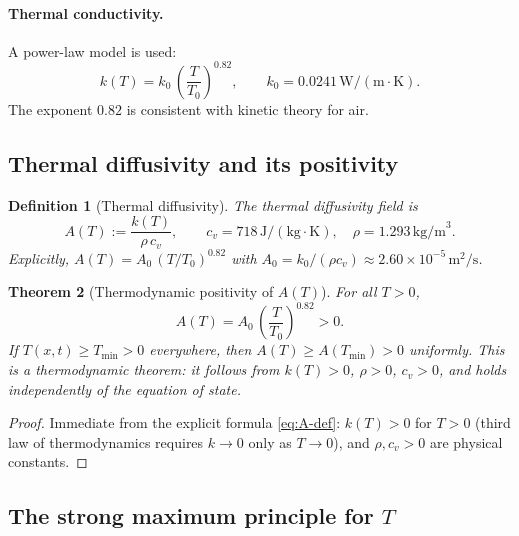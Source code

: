 \documentclass[12pt]{article}
\newtheorem{theorem}{Theorem}[section]
\newtheorem{definition}[theorem]{Definition}
\begin{document}
\paragraph{Thermal conductivity.}
A power-law model is used:
\begin{equation}
  \label{eq:k-power}
  k(T) = k_0\,\left(\frac{T}{T_0}\right)^{0.82},
  \qquad k_0 = 0.0241\,\mathrm{W/(m\cdot K)}.
\end{equation}
The exponent $0.82$ is consistent with kinetic theory for air.

\subsection{Thermal diffusivity and its positivity}
\label{ssec:A-field}

\begin{definition}[Thermal diffusivity]
  \label{def:AT}
  The \emph{thermal diffusivity field} is
  \begin{equation}
    \label{eq:A-def}
    A(T) := \frac{k(T)}{\rho\,c_v},
    \qquad c_v = 718\,\mathrm{J/(kg\cdot K)},\quad
    \rho = 1.293\,\mathrm{kg/m}^3.
  \end{equation}
  Explicitly, $A(T) = A_0\,(T/T_0)^{0.82}$ with
  $A_0 = k_0/(\rho c_v) \approx 2.60\times10^{-5}\,\mathrm{m}^2/\mathrm{s}$.
\end{definition}

\begin{theorem}[Thermodynamic positivity of $A(T)$]
  \label{thm:A-positive}
  For all $T > 0$,
  \begin{equation}
    \label{eq:A-positive}
    A(T) = A_0\,\left(\frac{T}{T_0}\right)^{0.82} > 0.
  \end{equation}
  If $T(x,t) \geq T_{\min} > 0$ everywhere, then $A(T) \geq A(T_{\min}) > 0$
  uniformly.  This is a thermodynamic theorem: it follows from $k(T) > 0$,
  $\rho > 0$, $c_v > 0$, and holds independently of the equation of state.
\end{theorem}

\begin{proof}
  Immediate from the explicit formula \eqref{eq:A-def}: $k(T) > 0$ for $T > 0$
  (third law of thermodynamics requires $k\to 0$ only as $T\to 0$), and
  $\rho, c_v > 0$ are physical constants.
\end{proof}

\subsection{The strong maximum principle for $T$}
\label{ssec:max-principle}
\end{document}

